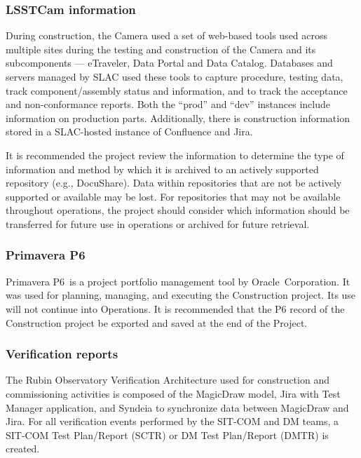 \subsubsection{LSSTCam information}

During construction, the Camera used a set of web-based tools used across multiple sites during the testing and construction of the Camera and its subcomponents --- eTraveler, Data Portal and Data Catalog.
Databases and servers managed by SLAC used these tools to capture procedure, testing data, track component/assembly status and information, and to track the acceptance and non-conformance reports.
Both the ``prod'' and ``dev'' instances include information on production parts.
Additionally, there is construction information stored in a SLAC-hosted instance of Confluence and Jira.

It is recommended the project review the information to determine the type of information and method by which it is archived to an actively supported repository (e.g., DocuShare).
Data within repositories that are not be actively supported or available may be lost.
For repositories that may not be available throughout operations, the project should consider which information should be transferred for future use in operations or archived for future retrieval.

\subsubsection{Primavera P6}

Primavera P6\textregistered\ is a project portfolio management tool by Oracle\textregistered\ Corporation. \citep{P6-cite}
It was used for planning, managing, and executing the Construction project.
Its use will not continue into Operations.
It is recommended that the P6 record of the Construction project be exported and saved at the end of the Project.

\subsubsection{Verification reports}

The Rubin Observatory Verification Architecture used for construction and commissioning activities is composed of the MagicDraw model, Jira with Test Manager application, and Syndeia to synchronize data between MagicDraw and Jira.
For all verification events performed by the SIT-COM and DM teams, a SIT-COM Test Plan/Report (SCTR) or DM Test Plan/Report (DMTR) is created.


